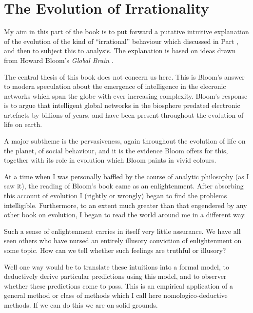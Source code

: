 
\part{The Evolution of Irrationality}\label{partII}

My aim in this part of the book is to put forward a putative intuitive explanation of the evolution of the kind of ``irrational'' behaviour which discussed in Part \label{partI}, and then to subject this to analysis.
The explanation is based on ideas drawn from Howard Bloom's \emph{Global Brain} \cite{bloom}.

The central thesis of this book does not concern us here.
This is Bloom's answer to modern speculation about the emergence of intelligence in the elecronic networks which span the globe with ever increasing complexity.
Bloom's response is to argue that intelligent global networks in the biosphere predated electronic artefacts by billions of years, and have been present throughout the evolution of life on earth.

A major subtheme is the pervasiveness, again throughout the evolution of life on the planet, of social behaviour, and it is the evidence Bloom offers for this, together with its role in evolution which Bloom paints in vivid colours.

At a time when I was personally baffled by the course of analytic philosophy (as I saw it), the reading of Bloom's book came as an enlightenment.
After absorbing this account of evolution I (rightly or wrongly) began to find the problems intelligible.
Furthermore, to an extent much greater than that engendered by any other book on evolution, I began to read the world around me in a different way.

Such a sense of enlightenment carries in itself very little assurance.
We have all seen others who have nursed an entirely illusory conviction of enlightenment on some topic.
How can we tell whether such feelings are truthful or illusory?

Well one way would be to translate these intuitions into a formal model, to deductively derive particular predictions using this model, and to observer whether these predictions come to pass.
This is an empirical application of a general method or class of methods which I call here nomologico-deductive methods.
If we can do this we are on solid grounds.



